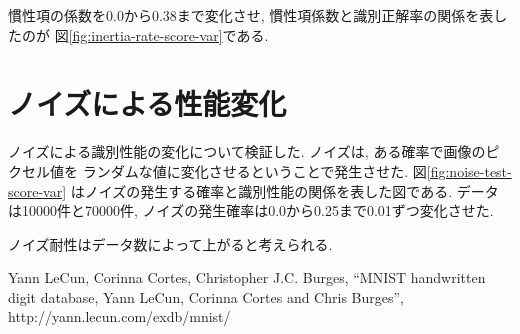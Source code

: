 \documentclass[10pt]{jarticle}
\begin{document}
慣性項の係数を0.0から0.38まで変化させ, 慣性項係数と識別正解率の関係を表したのが
図\ref{fig:inertia-rate-score-var}である. 

\section{ノイズによる性能変化}
ノイズによる識別性能の変化について検証した. ノイズは, ある確率で画像のピクセル値を
ランダムな値に変化させるということで発生させた. 図\ref{fig:noise-test-score-var}
はノイズの発生する確率と識別性能の関係を表した図である. 
データは10000件と70000件, ノイズの発生確率は0.0から0.25まで0.01ずつ変化させた. 

ノイズ耐性はデータ数によって上がると考えられる. 



\begin{thebibliography}{9}
   Yann LeCun, Corinna Cortes, Christopher J.C. Burges,
    ``MNIST handwritten digit database, Yann LeCun, Corinna Cortes and Chris Burges'',
    http://yann.lecun.com/exdb/mnist/
\end{thebibliography}

\end{document}
